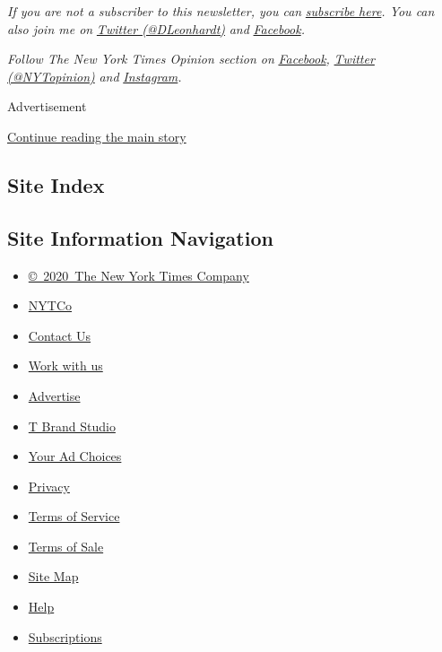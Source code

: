 \emph{If you are not a subscriber to this newsletter, you can}
\href{https://www.nytimes.com/newsletters/david-leonhardt}{\emph{subscribe
here}}\emph{. You can also join me on}
\href{https://twitter.com/DLeonhardt}{\emph{Twitter (@DLeonhardt)}}
\emph{and}
\href{https://www.facebook.com/DavidRLeonhardt/}{\emph{Facebook}}\emph{.}

\emph{Follow The New York Times Opinion section on}
\href{https://www.facebook.com/nytopinion}{\emph{Facebook}}\emph{,}
\href{http://twitter.com/NYTOpinion}{\emph{Twitter (@NYTopinion)}}
\emph{and}
\href{https://www.instagram.com/nytopinion/}{\emph{Instagram}}\emph{.}

Advertisement

\protect\hyperlink{after-bottom}{Continue reading the main story}

\hypertarget{site-index}{%
\subsection{Site Index}\label{site-index}}

\hypertarget{site-information-navigation}{%
\subsection{Site Information
Navigation}\label{site-information-navigation}}

\begin{itemize}
\tightlist
\item
  \href{https://help.nytimes.com/hc/en-us/articles/115014792127-Copyright-notice}{©~2020~The
  New York Times Company}
\end{itemize}

\begin{itemize}
\tightlist
\item
  \href{https://www.nytco.com/}{NYTCo}
\item
  \href{https://help.nytimes.com/hc/en-us/articles/115015385887-Contact-Us}{Contact
  Us}
\item
  \href{https://www.nytco.com/careers/}{Work with us}
\item
  \href{https://nytmediakit.com/}{Advertise}
\item
  \href{http://www.tbrandstudio.com/}{T Brand Studio}
\item
  \href{https://www.nytimes.com/privacy/cookie-policy\#how-do-i-manage-trackers}{Your
  Ad Choices}
\item
  \href{https://www.nytimes.com/privacy}{Privacy}
\item
  \href{https://help.nytimes.com/hc/en-us/articles/115014893428-Terms-of-service}{Terms
  of Service}
\item
  \href{https://help.nytimes.com/hc/en-us/articles/115014893968-Terms-of-sale}{Terms
  of Sale}
\item
  \href{https://spiderbites.nytimes.com}{Site Map}
\item
  \href{https://help.nytimes.com/hc/en-us}{Help}
\item
  \href{https://www.nytimes.com/subscription?campaignId=37WXW}{Subscriptions}
\end{itemize}
